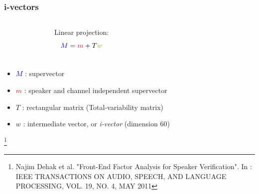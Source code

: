 \documentclass[11pt,english]{beamer}
\newcommand\blfootnote[1]{%
 \begingroup
  \renewcommand\thefootnote{}\footnote{#1}%
  \addtocounter{footnote}{-1}%
  \endgroup
}
\begin{document}
\begin{frame}
  \frametitle{i-vectors}
  \begin{columns}
    \begin{figure}
    
    \end{figure}
    
    
  	Linear projection:
    $$\textcolor{blue}{M} = \textcolor{red}{m} + T\textcolor{mygreen}{w}$$
    
    \\
  \end{columns}
    \vspace{1cm}
    \begin{itemize}
    \item \textcolor{blue}{$M$} : supervector
    \item \textcolor{red}{$m$} : speaker and channel independent supervector
    \item $T$ : rectangular matrix (Total-variability matrix)
    \item \textcolor{mygreen}{$w$} : intermediate vector, or \emph{i-vector}
      (dimension 60)
    \end{itemize}

 \blfootnote{ Najim Dehak et al. "Front-End Factor Analysis for Speaker Verification". In : IEEE TRANSACTIONS ON AUDIO, SPEECH, AND LANGUAGE PROCESSING, VOL. 19, NO. 4, MAY 2011}
\end{frame}
\end{document}
